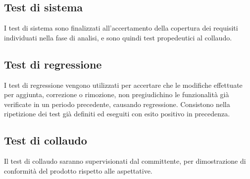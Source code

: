 \subsection{Test di sistema}
I test di sistema sono finalizzati all'accertamento della copertura dei requisiti individuati nella fase di analisi, e sono quindi test propedeutici al collaudo.

\subsection{Test di regressione}
I test di regressione vengono utilizzati per accertare che le modifiche effettuate per aggiunta, correzione o rimozione, non pregiudichino le funzionalità già verificate in un periodo precedente, causando regressione. Consistono nella ripetizione dei test già definiti ed eseguiti con esito positivo in precedenza.

\subsection{Test di collaudo}
Il test di collaudo saranno supervisionati dal committente, per dimostrazione di conformità del prodotto rispetto alle aspettative.
